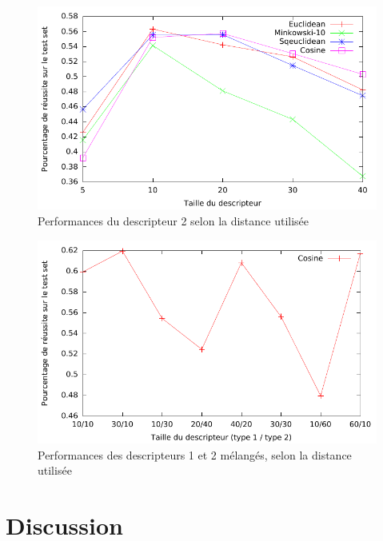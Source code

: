 \documentclass[a4paper,10pt]{article} %
\theoremstyle{definition} %
\begin{document}
\begin{figure}[H]
  \includegraphics[scale=1.15]{../plot/courbe2.pdf}
\caption{Performances du descripteur 2 selon la distance utilisée}
\label{d2}
\end{figure}

\begin{figure}[H]
  \includegraphics[scale=1.15]{../plot/courbe3.pdf}
\caption{Performances des descripteurs 1 et 2 mélangés, selon la distance utilisée}
\label{d3}
\end{figure}


\section{Discussion}
\end{document}
